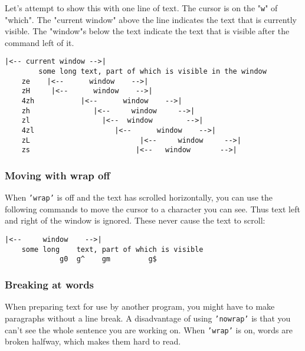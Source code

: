 Let's attempt to show this with one line of text.
The cursor is on the "\texttt{w}" of "which".
The "current window" above the line indicates the text that is currently visible.
The "window"s below the text indicate the text that is visible after the command left of it.

\begin{Verbatim}[samepage=true]
                      |<-- current window -->|
        some long text, part of which is visible in the window 
    ze    |<--      window    -->|
    zH     |<--      window    -->|
    4zh           |<--      window    -->|
    zh               |<--     window     -->|
    zl                 |<--  window        -->|
    4zl                   |<--      window    -->|
    zL                          |<--     window     -->|
    zs                         |<--   window       -->|
\end{Verbatim}

\subsubsection{Moving with wrap off}
When \texttt{'wrap'} is off and the text has scrolled horizontally, you can use the following commands to move the cursor to a character you can see.
Thus text left and right of the window is ignored.
These never cause the text to scroll:

\begin{center}  \end{center}

\begin{Verbatim}[samepage=true]
            |<--     window    -->|
    some long    text, part of which is visible 
             g0  g^    gm         g$
\end{Verbatim}

\subsubsection{Breaking at words}
\label{edit-no-break}
When preparing text for use by another program, you might have to make paragraphs without a line break.
A disadvantage of using \texttt{'nowrap'} is that you can't see the whole sentence you are working on.
When \texttt{'wrap'} is on, words are broken halfway, which makes them hard to read.

